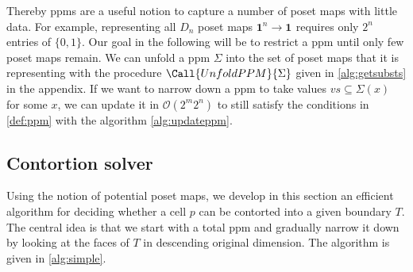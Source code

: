 \documentclass{llncs}
\newcommand{\pint}[1]{\mathbf{1}^{#1}}
\newcommand{\restrict}[2]{{#1}|_{#2}}
\newcommand{\pow}[1]{\mathcal{P}({#1})}
\begin{document}
Thereby ppms are a useful notion to capture a number of poset maps with
little data. For example, representing all $D_n$ poset maps $\pint{n} \to
\pint{}$ requires only $2^n$ entries of $\{0,1\}$. Our goal in the following
will be to restrict a ppm until only few poset maps remain. We can unfold a ppm $\Sigma$
into the set of poset maps that it is representing with the procedure
$\Call{UnfoldPPM}{\Sigma}$ given in \autoref{alg:getsubsts} in the appendix. If we
want to narrow down a ppm to take values $vs \subseteq \Sigma(x)$ for some $x$, we can
update it in $\mathcal{O}(2^m2^n)$ to still satisfy the conditions in
\autoref{def:ppm} with the algorithm \autoref{alg:updateppm}.




\subsection{Contortion solver}
\label{ssec:contortionsolver}

Using the notion of potential poset maps, we develop in this section an
efficient algorithm for deciding whether a cell $p$ can be contorted into a given
boundary $T$. The central idea is that we start with a total ppm and gradually
narrow it down by looking at the faces of $T$ in descending original dimension.
The algorithm is given in \autoref{alg:simple}.
\end{document}
